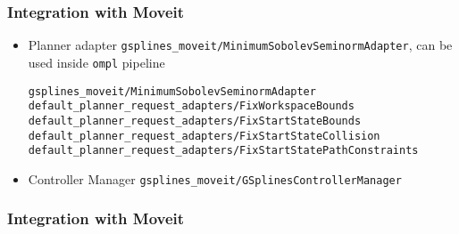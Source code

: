 \begin{frame}[fragile]
	\frametitle{Integration with Moveit}
	\begin{itemize}
		\item Planner adapter \Verb|gsplines_moveit/MinimumSobolevSeminormAdapter|, can be used inside \Verb|ompl| pipeline
		      \begin{lstlisting}
gsplines_moveit/MinimumSobolevSeminormAdapter
default_planner_request_adapters/FixWorkspaceBounds
default_planner_request_adapters/FixStartStateBounds
default_planner_request_adapters/FixStartStateCollision
default_planner_request_adapters/FixStartStatePathConstraints
	          \end{lstlisting}
		\item  Controller Manager \Verb|gsplines_moveit/GSplinesControllerManager|
	\end{itemize}
\end{frame}

\begin{frame}[t]
	\frametitle{Integration with Moveit}

\end{frame}
